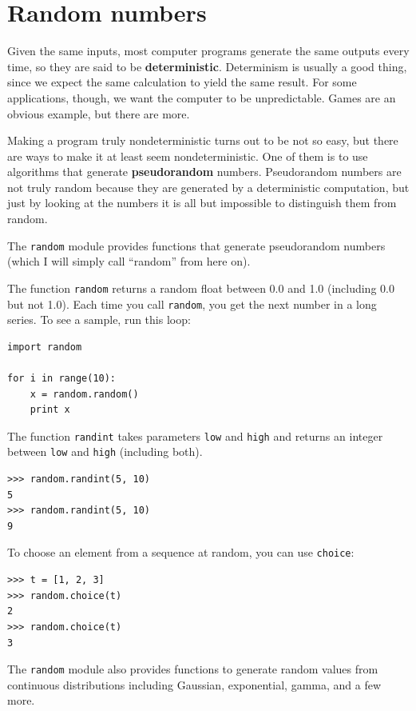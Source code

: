 \documentclass[10pt]{book}
\begin{document}
\begin{CJK}{UTF8}{gbsn}
\begin{exercise}
\end{exercise}


\section{Random numbers}

Given the same inputs, most computer programs generate the same
outputs every time, so they are said to be {\bf deterministic}.
Determinism is usually a good thing, since we expect the same
calculation to yield the same result.  For some applications, though,
we want the computer to be unpredictable.  Games are an obvious
example, but there are more.

Making a program truly nondeterministic turns out to be not so easy,
but there are ways to make it at least seem nondeterministic.  One of
them is to use algorithms that generate {\bf pseudorandom} numbers.
Pseudorandom numbers are not truly random because they are generated
by a deterministic computation, but just by looking at the numbers it
is all but impossible to distinguish them from random.

The {\tt random} module provides functions that generate
pseudorandom numbers (which I will simply call ``random'' from
here on).

The function {\tt random} returns a random float
between 0.0 and 1.0 (including 0.0 but not 1.0).  Each time you
call {\tt random}, you get the next number in a long series.  To see a
sample, run this loop:

\begin{verbatim}
import random

for i in range(10):
    x = random.random()
    print x
\end{verbatim}
%
The function {\tt randint} takes parameters {\tt low} and
{\tt high} and returns an integer between {\tt low} and
{\tt high} (including both).

\begin{verbatim}
>>> random.randint(5, 10)
5
>>> random.randint(5, 10)
9
\end{verbatim}
%
To choose an element from a sequence at random, you can use
{\tt choice}:

\begin{verbatim}
>>> t = [1, 2, 3]
>>> random.choice(t)
2
>>> random.choice(t)
3
\end{verbatim}
%
The {\tt random} module also provides functions to generate
random values from continuous distributions including
Gaussian, exponential, gamma, and a few more.


\end{CJK}
\end{document}
